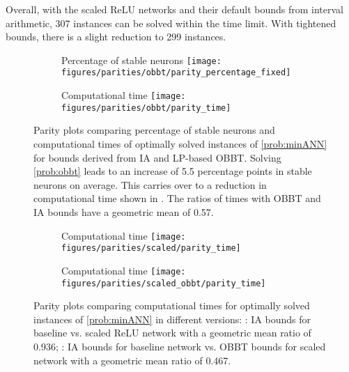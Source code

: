 Overall, with the scaled ReLU networks and their default bounds from interval arithmetic, 307 instances can be solved within the time limit. With tightened bounds, there is a slight reduction to 299 instances.


\begin{figure}
    \centering
    \begin{subfigure}{.47\linewidth}
        \centering
        Percentage of stable neurons
        \texttt{[image: figures/parities/obbt/parity\_percentage\_fixed]}
        \label{subfig:percentage_fixed_IA_vs_OBBT}
    \end{subfigure}
    \begin{subfigure}{.47\linewidth}
        \centering
        Computational time
        \texttt{[image: figures/parities/obbt/parity\_time]}
        \label{subfig:time_IA_vs_OBBT}
    \end{subfigure}

    \caption{Parity plots comparing percentage of stable neurons and computational times of optimally solved instances of \eqref{prob:minANN} for bounds derived from IA and LP-based OBBT. Solving \eqref{prob:obbt} leads to an increase of 5.5 percentage points in stable neurons on average. This carries over to a reduction in computational time shown in . The ratios of times with OBBT and IA bounds have a geometric mean of 0.57.}
    \label{fig:improvement_obbt}
\end{figure}


\begin{figure}
    \centering
    \begin{subfigure}{.47\linewidth}
        \centering
        Computational time
        \texttt{[image: figures/parities/scaled/parity\_time]}
        \label{subfig:IA_vs_scaler}
    \end{subfigure}
    \begin{subfigure}{.47\linewidth}
        \centering
        Computational time
        \texttt{[image: figures/parities/scaled\_obbt/parity\_time]}
        \label{subfig:IA_vs_scaler_and_OBBT}
    \end{subfigure}

    \caption{Parity plots comparing computational times for optimally solved instances of \eqref{prob:minANN} in different versions: : IA bounds for baseline vs. scaled ReLU network with a geometric mean ratio of {0.936}; : IA bounds for baseline network vs. OBBT bounds for scaled network with a geometric mean ratio of {0.467}.}
    \label{fig:improvement_scaling_obbt}
\end{figure}

